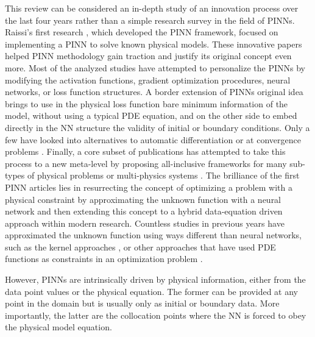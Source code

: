 \documentclass[pdflatex,sn-basic]{sn-jnl}%
\theoremstyle{thmstyleone}%
\theoremstyle{thmstyletwo}%
\theoremstyle{thmstylethree}%
\begin{document}
This review can be considered an in-depth study of an innovation process over the last four years rather than a simple research survey in the field of PINNs.
%
%
Raissi's first research \citep{Rai2017_PhysicsInformedDeep1_PerRPK,Rai2017_PhysicsInformedDeep2_PerRPK}, which developed the PINN framework, focused on implementing a PINN to solve known physical models.
These innovative papers helped PINN methodology gain traction and justify its original concept even more.
%
Most of the analyzed studies have attempted to personalize the PINNs by modifying the activation functions, gradient optimization procedures, neural networks, or loss function structures.
A border extension of PINNs original idea brings to use in the physical loss function bare minimum information of the model, without using a typical PDE equation, and on the other side to embed directly in the NN structure the validity of initial or boundary conditions.
Only a few have looked into alternatives to automatic differentiation \citep{Fan2021_HighEfficientHybrid_Fan} or at convergence problems \citep{Wan2021_UnderstandingMitigatingGradient_TenWTP, Wan2022_WhenWhyPinns_YuWYP}.
%
Finally, a core subset of publications has attempted to take this process to a new meta-level by proposing all-inclusive frameworks for many sub-types of physical problems or multi-physics systems \citep{Cai2021_DeepmmnetInferringElectroconvection_WanCWL}.
%
The brilliance of the first PINN articles \citep{Rai2017_PhysicsInformedDeep1_PerRPK,Rai2017_PhysicsInformedDeep2_PerRPK} lies in resurrecting the concept of optimizing a problem with a physical constraint by approximating the unknown function with a neural network \citep{Dis1994_NeuralNetworkBased_PhaDP} and then extending this concept to a hybrid data-equation driven approach within modern research. 
%
Countless studies in previous years have approximated the unknown function using ways different than neural networks, such as the kernel approaches \citep{Owh2019_KernelFlowsLearning_YooOY}, or other approaches that have used PDE functions as constraints in an optimization problem \citep{hinze2008optimization}.

However, PINNs are intrinsically driven by physical information, either from the data point values or the physical equation.
The former can be provided at any point in the domain but is usually only as initial or boundary data.
More importantly, the latter are the collocation points where the NN is forced to obey the physical model equation. 
\end{document}
